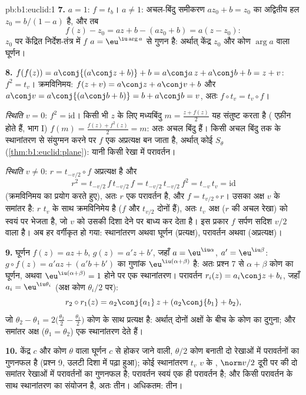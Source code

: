 \begin{solution}{pb:b1:euclid:1}
\textbf{7.} $a = 1$: $f = t_b$। $a \neq 1$: अचल-बिंदु समीकरण $az_0 + b =
z_0$ का अद्वितीय हल $z_0 = b/(1 - a)$ है, और तब
\[
f(z) - z_0 = az + b - (az_0 + b) = a(z - z_0):
\]
$z_0$ पर केंद्रित निर्देश-तंत्र में $f$ $a = \eu^{\iu\arg a}$ से गुणन है:
अर्थात् केंद्र $z_0$ और कोण $\arg a$ वाला घूर्णन।

\textbf{8.} $f(f(z)) = a\conj{(a\conj z + b)} + b = a\conj a\,z + a\conj b +
b = z + v$: $f^2 = t_v$। क्रमविनिमय: $f(z + v) = a\conj z + a\conj v + b$ और
$a\conj v = a\conj{(a\conj b + b)} = b + a\conj b = v$, अतः $f\circ t_v =
t_v\circ f$।

\emph{स्थिति $v = 0$}: $f^2 = \mathrm{id}$। किसी भी $z$ के लिए मध्यबिंदु $m
= \frac{z + f(z)}2$ यह संतुष्ट करता है ( एफ़ीन होते हैं, भाग I) $f(m)
= \frac{f(z) + f^2(z)}{2} = m$: अतः अचल बिंदु हैं। किसी अचल बिंदु तक के
स्थानांतरण से संयुग्मन करने पर $f$ एक  अप्रत्यक्ष  बन जाता है,
अर्थात् कोई $S_\theta$ (\cref{thm:b1:euclid:plane}): यानी किसी रेखा में
परावर्तन।

\emph{स्थिति $v \neq 0$}: $r = t_{-v/2}\circ f$ अप्रत्यक्ष है और
\[
r^2 = t_{-v/2}\,f\,t_{-v/2}\,f = t_{-v/2}\,t_{-v/2}\,f^2
= t_{-v}\,t_v = \mathrm{id}
\]
(क्रमविनिमय का प्रयोग करते हुए), अतः $r$ एक परावर्तन है, और $f =
t_{v/2}\circ r$। उसका अक्ष $v$ के समांतर है: $r$ $t_v$ के साथ क्रमविनिमेय है
($f$ और $t_{v/2}$ दोनों हैं), अतः $t_v$ अक्ष ($r$ की अचल रेखा) को स्वयं पर
भेजता है, जो $v$ को उसकी दिशा देने पर बाध्य कर देता है। इस प्रकार $f$ सर्पण
सदिश $v/2$ वाला  है। अब हर  वर्गीकृत हो गया: स्थानांतरण
अथवा घूर्णन (प्रत्यक्ष), परावर्तन अथवा  (अप्रत्यक्ष)।

\textbf{9.} घूर्णन $f(z) = az + b$, $g(z) = a'z + b'$, जहाँ $a =
\eu^{\iu\alpha}$, $a' = \eu^{\iu\beta}$: $g\circ f(z) = a'az + (a'b + b')$
का  गुणांक $\eu^{\iu(\alpha+\beta)}$ है: अतः प्रश्न 7 से $\alpha +
\beta$ कोण का घूर्णन, अथवा $\eu^{\iu(\alpha+\beta)} = 1$ होने पर एक
स्थानांतरण। परावर्तन $r_i(z) = a_i\conj z + b_i$, जहाँ $a_i =
\eu^{\iu\theta_i}$ (अक्ष कोण $\theta_i/2$ पर):
\[
r_2\circ r_1(z) = a_2\conj{a_1}\,z + (a_2\conj{b_1} + b_2),
\]
जो $\theta_2 - \theta_1 = 2\bigl(\tfrac{\theta_2}2 -
\tfrac{\theta_1}2\bigr)$ कोण के साथ प्रत्यक्ष है: अर्थात् दोनों अक्षों के
बीच के कोण का दुगुना; और समांतर अक्ष ($\theta_1 = \theta_2$) एक स्थानांतरण
देते हैं।

\textbf{10.} केंद्र $c$ और कोण $\theta$ वाला घूर्णन $c$ से होकर जाने वाली,
$\theta/2$ कोण बनाती दो रेखाओं में परावर्तनों का गुणनफल है (प्रश्न 9, उलटी
दिशा में पढ़ा हुआ); कोई स्थानांतरण $t_v$ $v$ के , $\norm v/2$ दूरी पर
की दो समांतर रेखाओं में परावर्तनों का गुणनफल है; परावर्तन स्वयं एक ही
परावर्तन है; और  किसी परावर्तन के साथ स्थानांतरण का संयोजन है,
अतः तीन। अधिकतम: तीन।


\end{solution}

